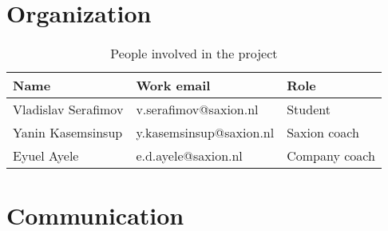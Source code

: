 \documentclass{report}
\begin{document}
	\section{Organization}
	
	\begin{table}[h]
		\centering
		\begin{tabular}{|l|l|l|}
			\hline
			Name                & Work email              & Role          \\ \hline
			Vladislav Serafimov & v.serafimov@saxion.nl   & Student       \\ \hline
			Yanin Kasemsinsup   & y.kasemsinsup@saxion.nl & Saxion coach  \\ \hline
			Eyuel Ayele         & e.d.ayele@saxion.nl     & Company coach \\ \hline
		\end{tabular}
		\caption{People involved in the project}
		\label{involved}
	\end{table}
	
	
	\section{Communication} \label{communication}
	
\end{document}
